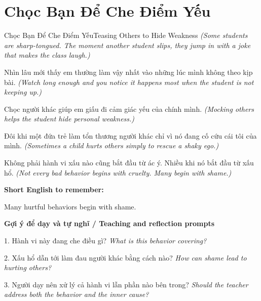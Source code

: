 \section{Chọc Bạn Để Che Điểm Yếu}
\begin{truyen}{Chọc Bạn Để Che Điểm Yếu}{Teasing Others to Hide Weakness}
\textit{(Some students are sharp-tongued. The moment another student slips, they jump in with a joke that makes the class laugh.)}

Nhìn lâu mới thấy em thường làm vậy nhất vào những lúc mình không theo kịp bài.
\textit{(Watch long enough and you notice it happens most when the student is not keeping up.)}

Chọc người khác giúp em giấu đi cảm giác yếu của chính mình.
\textit{(Mocking others helps the student hide personal weakness.)}

Đôi khi một đứa trẻ làm tổn thương người khác chỉ vì nó đang cố cứu cái tôi của mình.
\textit{(Sometimes a child hurts others simply to rescue a shaky ego.)}

\end{truyen}

\begin{baihoc}
Không phải hành vi xấu nào cũng bắt đầu từ ác ý. Nhiều khi nó bắt đầu từ xấu hổ.
\textit{(Not every bad behavior begins with cruelty. Many begin with shame.)}
\end{baihoc}

\begin{ghinhoanh}
\textbf{Short English to remember:}

Many hurtful behaviors begin with shame.

\end{ghinhoanh}

\begin{tuhocnhanh}
\textbf{Gợi ý để dạy và tự nghĩ / Teaching and reflection prompts}

1. Hành vi này đang che điều gì? \textit{What is this behavior covering?}

2. Xấu hổ dẫn tới làm đau người khác bằng cách nào? \textit{How can shame lead to hurting others?}

3. Người dạy nên xử lý cả hành vi lẫn phần nào bên trong? \textit{Should the teacher address both the behavior and the inner cause?}
\end{tuhocnhanh}
\ngancach

